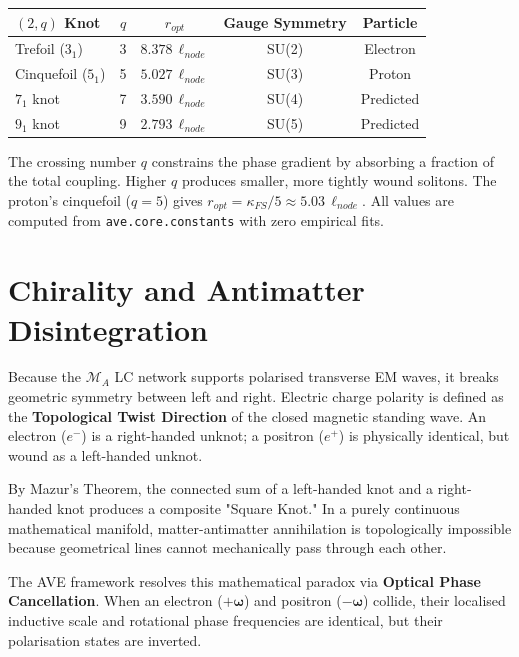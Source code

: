 \begin{center}
\small
\renewcommand{\arraystretch}{1.2}
\begin{tabular}{lcccc}
\toprule
\textbf{$(2,q)$ Knot} & \textbf{$q$} & \textbf{$r_{opt}$} & \textbf{Gauge Symmetry} & \textbf{Particle} \\
\midrule
Trefoil ($3_1$)    & 3 & $8.378\,\ell_{node}$ & SU(2) & Electron \\
Cinquefoil ($5_1$) & 5 & $5.027\,\ell_{node}$ & SU(3) & Proton \\
$7_1$ knot         & 7 & $3.590\,\ell_{node}$ & SU(4) & Predicted \\
$9_1$ knot         & 9 & $2.793\,\ell_{node}$ & SU(5) & Predicted \\
\bottomrule
\end{tabular}
\end{center}

The crossing number $q$ constrains the phase gradient by absorbing a fraction of the total coupling. Higher $q$ produces smaller, more tightly wound solitons. The proton's cinquefoil ($q = 5$) gives $r_{opt} = \kappa_{FS}/5 \approx 5.03\,\ell_{node}$. All values are computed from \texttt{ave.core.constants} with zero empirical fits.

\section{Chirality and Antimatter Disintegration}
Because the $\mathcal{M}_A$ LC network supports polarised transverse EM waves, it breaks geometric symmetry between left and right. Electric charge polarity is defined as the \textbf{Topological Twist Direction} of the closed magnetic standing wave. An electron ($e^-$) is a right-handed unknot; a positron ($e^+$) is physically identical, but wound as a left-handed unknot.

By Mazur's Theorem, the connected sum of a left-handed knot and a right-handed knot produces a composite "Square Knot." In a purely continuous mathematical manifold, matter-antimatter annihilation is topologically impossible because geometrical lines cannot mechanically pass through each other.

The AVE framework resolves this mathematical paradox via \textbf{Optical Phase Cancellation}. When an electron ($+\boldsymbol{\omega}$) and positron ($-\boldsymbol{\omega}$) collide, their localised inductive scale and rotational phase frequencies are identical, but their polarisation states are inverted.

